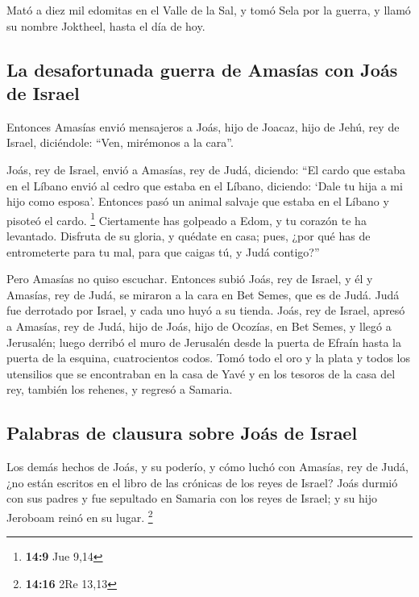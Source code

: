  Mató a diez mil edomitas en el Valle de la Sal, y tomó
Sela por la guerra, y llamó su nombre Joktheel, hasta el día de hoy.

\hypertarget{la-desafortunada-guerra-de-amasuxedas-con-jouxe1s-de-israel}{%
\subsection{La desafortunada guerra de Amasías con Joás de
Israel}\label{la-desafortunada-guerra-de-amasuxedas-con-jouxe1s-de-israel}}

 Entonces Amasías envió mensajeros a Joás, hijo de Joacaz,
hijo de Jehú, rey de Israel, diciéndole: ``Ven, mirémonos a la cara''.

 Joás, rey de Israel, envió a Amasías, rey de Judá,
diciendo: ``El cardo que estaba en el Líbano envió al cedro que estaba
en el Líbano, diciendo: `Dale tu hija a mi hijo como esposa'. Entonces
pasó un animal salvaje que estaba en el Líbano y pisoteó el cardo.
\footnote{\textbf{14:9} Jue 9,14}  Ciertamente has
golpeado a Edom, y tu corazón te ha levantado. Disfruta de su gloria, y
quédate en casa; pues, ¿por qué has de entrometerte para tu mal, para
que caigas tú, y Judá contigo?''

 Pero Amasías no quiso escuchar. Entonces subió Joás, rey
de Israel, y él y Amasías, rey de Judá, se miraron a la cara en Bet
Semes, que es de Judá.  Judá fue derrotado por Israel, y
cada uno huyó a su tienda.  Joás, rey de Israel, apresó a
Amasías, rey de Judá, hijo de Joás, hijo de Ocozías, en Bet Semes, y
llegó a Jerusalén; luego derribó el muro de Jerusalén desde la puerta de
Efraín hasta la puerta de la esquina, cuatrocientos codos.
 Tomó todo el oro y la plata y todos los utensilios que
se encontraban en la casa de Yavé y en los tesoros de la casa del rey,
también los rehenes, y regresó a Samaria.

\hypertarget{palabras-de-clausura-sobre-jouxe1s-de-israel}{%
\subsection{Palabras de clausura sobre Joás de
Israel}\label{palabras-de-clausura-sobre-jouxe1s-de-israel}}

 Los demás hechos de Joás, y su poderío, y cómo luchó con
Amasías, rey de Judá, ¿no están escritos en el libro de las crónicas de
los reyes de Israel?  Joás durmió con sus padres y fue
sepultado en Samaria con los reyes de Israel; y su hijo Jeroboam reinó
en su lugar. \footnote{\textbf{14:16} 2Re 13,13}

